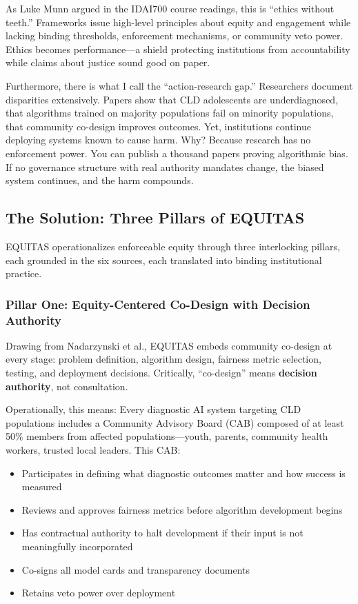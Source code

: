 \documentclass[12pt,a4paper]{article}
\begin{document}
As Luke Munn argued in the IDAI700 course readings, this is ``ethics without teeth.'' Frameworks issue high-level principles about equity and engagement while lacking binding thresholds, enforcement mechanisms, or community veto power. Ethics becomes performance---a shield protecting institutions from accountability while claims about justice sound good on paper.

Furthermore, there is what I call the ``action-research gap.'' Researchers document disparities extensively. Papers show that CLD adolescents are underdiagnosed, that algorithms trained on majority populations fail on minority populations, that community co-design improves outcomes. Yet, institutions continue deploying systems known to cause harm. Why? Because research has no enforcement power. You can publish a thousand papers proving algorithmic bias. If no governance structure with real authority mandates change, the biased system continues, and the harm compounds.

\subsection{The Solution: Three Pillars of EQUITAS}

EQUITAS operationalizes enforceable equity through three interlocking pillars, each grounded in the six sources, each translated into binding institutional practice.

\subsubsection{Pillar One: Equity-Centered Co-Design with Decision Authority}

Drawing from Nadarzynski et al., EQUITAS embeds community co-design at every stage: problem definition, algorithm design, fairness metric selection, testing, and deployment decisions. Critically, ``co-design'' means \textbf{decision authority}, not consultation.

Operationally, this means: Every diagnostic AI system targeting CLD populations includes a Community Advisory Board (CAB) composed of at least 50\% members from affected populations---youth, parents, community health workers, trusted local leaders. This CAB:

\begin{itemize}
\item Participates in defining what diagnostic outcomes matter and how success is measured
\item Reviews and approves fairness metrics before algorithm development begins
\item Has contractual authority to halt development if their input is not meaningfully incorporated
\item Co-signs all model cards and transparency documents
\item Retains veto power over deployment
\end{itemize}
\end{document}
